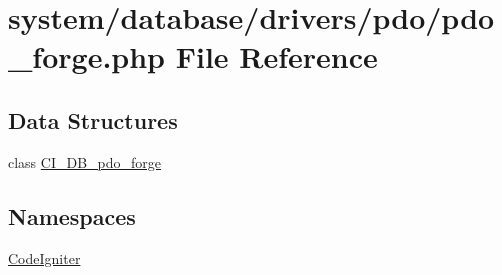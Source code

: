 \hypertarget{pdo__forge_8php}{\section{system/database/drivers/pdo/pdo\-\_\-forge.php File Reference}
\label{pdo__forge_8php}
}
\subsection*{Data Structures}
\begin{DoxyCompactItemize}
\item 
class \hyperlink{class_c_i___d_b__pdo__forge}{C\-I\-\_\-\-D\-B\-\_\-pdo\-\_\-forge}
\end{DoxyCompactItemize}
\subsection*{Namespaces}
\begin{DoxyCompactItemize}
\item 
\hyperlink{namespace_code_igniter}{Code\-Igniter}
\end{DoxyCompactItemize}
